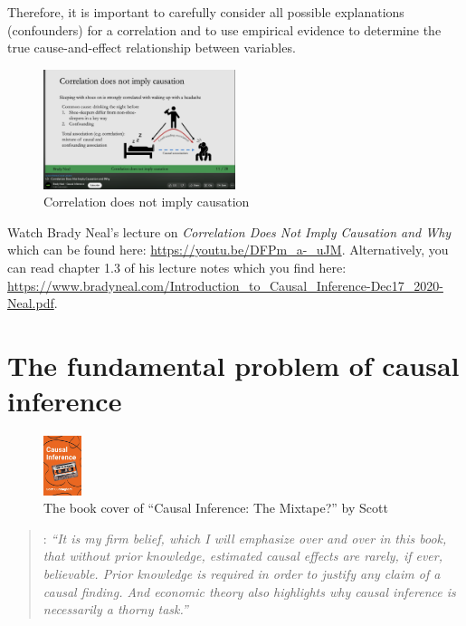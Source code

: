 \documentclass[
  12pt,
  oneside]{book}
\theoremstyle{definition}
\theoremstyle{definition}
\theoremstyle{definition}
\theoremstyle{definition}
\theoremstyle{remark}
\begin{document}
Therefore, it is important to carefully consider all possible explanations (confounders) for a correlation and to use empirical evidence to determine the true cause-and-effect relationship between variables.

\begin{figure}
\centering
\includegraphics[width=0.5\textwidth,height=\textheight]{fig/neal1-3.png}
\caption[\label{fig:cdnic} Correlation does not imply causation]{\label{fig:cdnic} Correlation does not imply causation\footnotemark{}}
\end{figure}

Watch Brady Neal's lecture on \emph{Correlation Does Not Imply Causation and Why} which can be found here: \url{https://youtu.be/DFPm_a-_uJM}. Alternatively, you can read chapter 1.3 of his lecture notes \citep{Neal2020Introduction} which you find here: \url{https://www.bradyneal.com/Introduction_to_Causal_Inference-Dec17_2020-Neal.pdf}.

\hypertarget{the-fundamental-problem-of-causal-inference}{%
\section{The fundamental problem of causal inference}\label{the-fundamental-problem-of-causal-inference}}

\begin{figure}
\centering
\includegraphics[width=0.1\textwidth,height=\textheight]{fig/cover-ci.jpg}
\caption{\label{fig:cunbook} The book cover of ``Causal Inference: The Mixtape?'' by Scott \citet{Cunningham2021Causal}}
\end{figure}

\begin{quote}
\citet[ch.~1.3]{Cunningham2021Causal}: \emph{``It is my firm belief, which I will emphasize over and over in this book, that without prior knowledge, estimated causal effects are rarely, if ever, believable. Prior knowledge is required in order to justify any claim of a causal finding. And economic theory also highlights why causal inference is necessarily a thorny task.''}
\end{quote}
\end{document}
